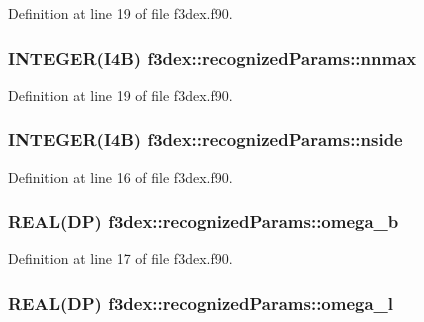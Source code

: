 Definition at line 19 of file f3dex.f90.

\hypertarget{typef3dex_1_1recognized_params_ac6069fd7b6bb17120d36be52d1bea292}{
\subsubsection[{nnmax}]{\setlength{\rightskip}{0pt plus 5cm}INTEGER(I4B) {\bf f3dex::recognizedParams::nnmax}}}
\label{typef3dex_1_1recognized_params_ac6069fd7b6bb17120d36be52d1bea292}


Definition at line 19 of file f3dex.f90.

\hypertarget{typef3dex_1_1recognized_params_a235ac2c9d0b577af0a76bbb4d2083beb}{
\subsubsection[{nside}]{\setlength{\rightskip}{0pt plus 5cm}INTEGER(I4B) {\bf f3dex::recognizedParams::nside}}}
\label{typef3dex_1_1recognized_params_a235ac2c9d0b577af0a76bbb4d2083beb}


Definition at line 16 of file f3dex.f90.

\hypertarget{typef3dex_1_1recognized_params_a7c62dc45475fd29830ae359b36938975}{
\subsubsection[{omega\_\-b}]{\setlength{\rightskip}{0pt plus 5cm}REAL(DP) {\bf f3dex::recognizedParams::omega\_\-b}}}
\label{typef3dex_1_1recognized_params_a7c62dc45475fd29830ae359b36938975}


Definition at line 17 of file f3dex.f90.

\hypertarget{typef3dex_1_1recognized_params_ac86f4fd432d2079a0146faa7b8998caa}{
\subsubsection[{omega\_\-l}]{\setlength{\rightskip}{0pt plus 5cm}REAL(DP) {\bf f3dex::recognizedParams::omega\_\-l}}}
\label{typef3dex_1_1recognized_params_ac86f4fd432d2079a0146faa7b8998caa}


